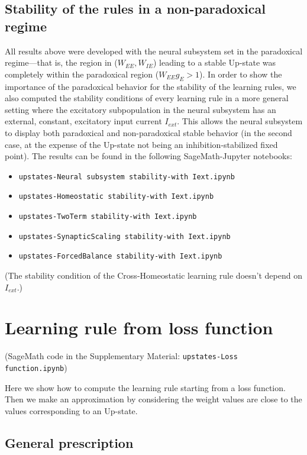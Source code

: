 \documentclass[twocolumn]{article}
\newcommand{\EE}{\mathit{EE}}
\newcommand{\IE}{\mathit{IE}}
\newcommand{\ext}{\mathit{ext}}
\begin{document}
\subsection{Stability of the rules in a non-paradoxical regime}
\label{sec.nonparadoxical}

All results above were developed with the neural subsystem set in the paradoxical regime---that is, the region in ($W_{\EE},W_{\IE}$) leading to a stable Up-state was completely within the paradoxical region ($W_{\EE}g_E > 1$). In order to show the importance of the paradoxical behavior for the stability of the learning rules, we also computed the stability conditions of every learning rule in a more general setting where the excitatory subpopulation in the neural subsystem has an external, constant, excitatory input current $I_{\ext}$. This allows the neural subsystem to display both paradoxical and non-paradoxical stable behavior (in the second case, at the expense of the Up-state not being an inhibition-stabilized fixed point). The results can be found in the following SageMath-Jupyter notebooks:
\begin{itemize}
\item[] {\tt upstates-Neural subsystem stability-with Iext.ipynb}
\item[] {\tt upstates-Homeostatic stability-with Iext.ipynb}
\item[] {\tt upstates-TwoTerm stability-with Iext.ipynb}
\item[] {\tt upstates-SynapticScaling stability-with Iext.ipynb}
\item[] {\tt upstates-ForcedBalance stability-with Iext.ipynb}
\end{itemize}

\noindent (The stability condition of the Cross-Homeostatic learning rule doesn't depend on $I_{\ext}$.)



\section{Learning rule from loss function}

(SageMath code in the Supplementary Material: {\tt upstates-Loss function.ipynb})

Here we show how to compute the learning rule starting from a loss function. Then we make an approximation by considering the weight values are close to the values corresponding to an Up-state.


\subsection{General prescription}
\end{document}
